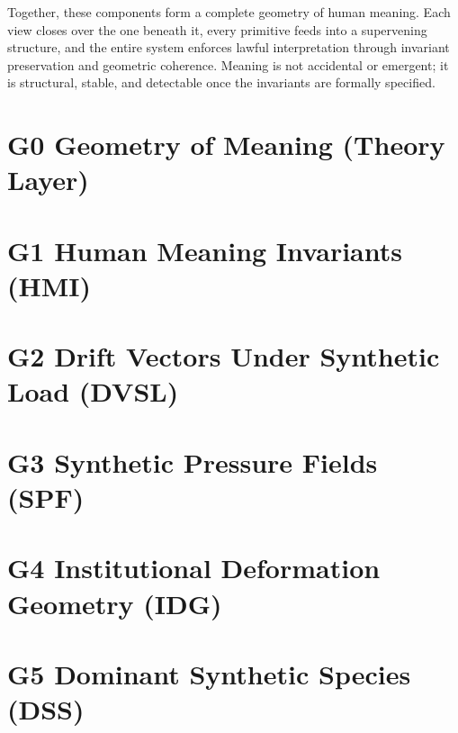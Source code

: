 \documentclass[11pt]{article}
\begin{document}
Together, these components form a complete geometry of human meaning. Each view
closes over the one beneath it, every primitive feeds into a supervening
structure, and the entire system enforces lawful interpretation through
invariant preservation and geometric coherence. Meaning is not accidental or
emergent; it is structural, stable, and detectable once the invariants are
formally specified.


%


\section{G0 Geometry of Meaning (Theory Layer)}


\section{G1 Human Meaning Invariants (HMI)}


\section{G2 Drift Vectors Under Synthetic Load (DVSL)}


\section{G3 Synthetic Pressure Fields (SPF)}


\section{G4 Institutional Deformation Geometry (IDG)}


\section{G5 Dominant Synthetic Species (DSS)}

\end{document}
